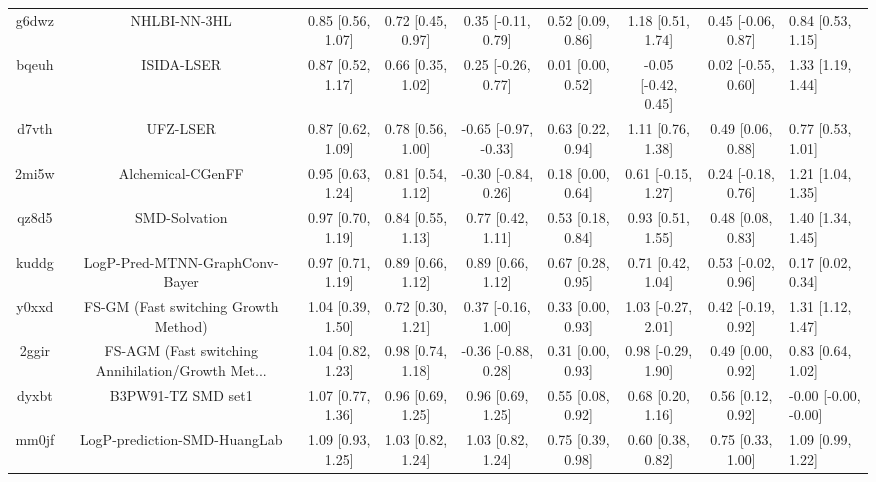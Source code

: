 \documentclass{article}
\begin{document}
\begin{center}
\begin{longtable}{|cccccccc|}
 g6dwz &                                       NHLBI-NN-3HL &  0.85 [0.56, 1.07] &  0.72 [0.45, 0.97] &    0.35 [-0.11, 0.79] &  0.52 [0.09, 0.86] &    1.18 [0.51, 1.74] &   0.45 [-0.06, 0.87] &     0.84 [0.53, 1.15] \\
 bqeuh &                                         ISIDA-LSER &  0.87 [0.52, 1.17] &  0.66 [0.35, 1.02] &    0.25 [-0.26, 0.77] &  0.01 [0.00, 0.52] &  -0.05 [-0.42, 0.45] &   0.02 [-0.55, 0.60] &     1.33 [1.19, 1.44] \\
 d7vth &                                           UFZ-LSER &  0.87 [0.62, 1.09] &  0.78 [0.56, 1.00] &  -0.65 [-0.97, -0.33] &  0.63 [0.22, 0.94] &    1.11 [0.76, 1.38] &    0.49 [0.06, 0.88] &     0.77 [0.53, 1.01] \\
 2mi5w &                                  Alchemical-CGenFF &  0.95 [0.63, 1.24] &  0.81 [0.54, 1.12] &   -0.30 [-0.84, 0.26] &  0.18 [0.00, 0.64] &   0.61 [-0.15, 1.27] &   0.24 [-0.18, 0.76] &     1.21 [1.04, 1.35] \\
 qz8d5 &                                      SMD-Solvation &  0.97 [0.70, 1.19] &  0.84 [0.55, 1.13] &     0.77 [0.42, 1.11] &  0.53 [0.18, 0.84] &    0.93 [0.51, 1.55] &    0.48 [0.08, 0.83] &     1.40 [1.34, 1.45] \\
 kuddg &                     LogP-Pred-MTNN-GraphConv-Bayer &  0.97 [0.71, 1.19] &  0.89 [0.66, 1.12] &     0.89 [0.66, 1.12] &  0.67 [0.28, 0.95] &    0.71 [0.42, 1.04] &   0.53 [-0.02, 0.96] &     0.17 [0.02, 0.34] \\
 y0xxd &               FS-GM (Fast switching Growth Method) &  1.04 [0.39, 1.50] &  0.72 [0.30, 1.21] &    0.37 [-0.16, 1.00] &  0.33 [0.00, 0.93] &   1.03 [-0.27, 2.01] &   0.42 [-0.19, 0.92] &     1.31 [1.12, 1.47] \\
 2ggir &  FS-AGM (Fast switching Annihilation/Growth Met... &  1.04 [0.82, 1.23] &  0.98 [0.74, 1.18] &   -0.36 [-0.88, 0.28] &  0.31 [0.00, 0.93] &   0.98 [-0.29, 1.90] &    0.49 [0.00, 0.92] &     0.83 [0.64, 1.02] \\
 dyxbt &                                 B3PW91-TZ SMD set1 &  1.07 [0.77, 1.36] &  0.96 [0.69, 1.25] &     0.96 [0.69, 1.25] &  0.55 [0.08, 0.92] &    0.68 [0.20, 1.16] &    0.56 [0.12, 0.92] &  -0.00 [-0.00, -0.00] \\
 mm0jf &                       LogP-prediction-SMD-HuangLab &  1.09 [0.93, 1.25] &  1.03 [0.82, 1.24] &     1.03 [0.82, 1.24] &  0.75 [0.39, 0.98] &    0.60 [0.38, 0.82] &    0.75 [0.33, 1.00] &     1.09 [0.99, 1.22] \\

\end{longtable}
\end{center}
\end{document}
